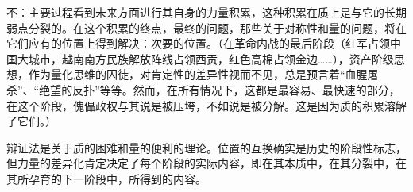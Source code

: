 \documentclass[fontset=fandol, a4paper, 12pt, twoside]{ctexart}
\begin{document}
不：主要过程看到未来方面进行其自身的力量积累，这种积累在质上是与它的长期弱点分裂的。在这个积累的终点，最终的问题，那些关于对称性和量的问题，将在它们应有的位置上得到解决：次要的位置。（在革命内战的最后阶段（红军占领中国大城市，越南南方民族解放阵线占领西贡，红色高棉占领金边……），资产阶级思想，作为量化思维的囚徒，对肯定性的差异性视而不见，总是预言着“血腥屠杀”、“绝望的反扑”等等。然而，在所有情况下，这都是最容易、最快速的部分，在这个阶段，傀儡政权与其说是被压垮，不如说是被分解。这是因为质的积累溶解了它们。）

辩证法是关于质的困难和量的便利的理论。位置的互换确实是历史的阶段性标志，但力量的差异化肯定决定了每个阶段的实际内容，即在其本质中，在其分裂中，在其所孕育的下一阶段中，所得到的内容。
\end{document}
